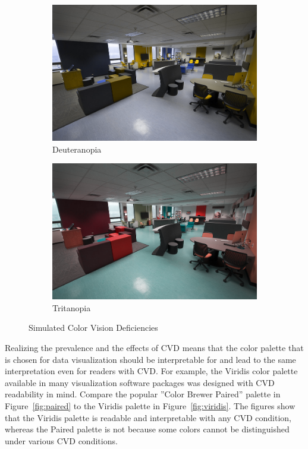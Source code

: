 \begin{figure}
\begin{subfigure}{.49\textwidth}
\includegraphics[width=\textwidth]{deutan_photo.jpg}
\caption{Deuteranopia} 
\label{fig:cvd4}
\end{subfigure}
\hfill
\begin{subfigure}{.49\textwidth}
\centering
\includegraphics[width=\textwidth]{tritan_photo.jpg}
\caption{Tritanopia} 
\label{fig:cvd5}
\end{subfigure}
\hfill
\caption{Simulated Color Vision Deficiencies}
\label{fig:cvd}
\end{figure}

Realizing the prevalence and the effects of CVD means that the color palette that is chosen for data visualization should be interpretable for and lead to the same interpretation even for readers with CVD. For example, the Viridis color palette available in many visualization software packages was designed with CVD readability in mind. Compare the popular ''Color Brewer Paired'' palette in Figure~\ref{fig:paired} to the Viridis palette in Figure~\ref{fig:viridis}. The figures show that the Viridis palette is readable and interpretable with any CVD condition, whereas the Paired palette is not because some colors cannot be distinguished under various CVD conditions.


